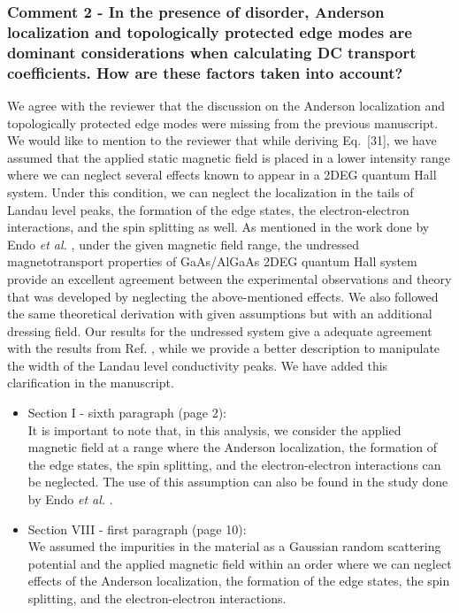 \documentclass{article}
\begin{document}
\subsubsection*{Comment 2 -
\color{RoyalBlue} In the presence of disorder, Anderson localization and topologically protected edge modes are dominant considerations when calculating DC transport coefficients. How are these factors taken into account?
}

We agree with the reviewer that the discussion on the Anderson localization and topologically protected edge modes were missing from the previous manuscript.
We would like to mention to the reviewer that while deriving Eq.~[31], we have assumed that the applied static magnetic field is placed in a lower intensity range where we can neglect several effects known to appear in a 2DEG quantum Hall system. Under this condition, we can neglect the localization in the tails of Landau level peaks, the formation of the edge states, the electron-electron interactions, and the spin splitting as well. As mentioned in the work done by Endo \textit{et al.} \cite{endo09}, under the given magnetic field range, the undressed magnetotransport properties of GaAs/AlGaAs 2DEG quantum Hall system provide an excellent agreement between the experimental observations and theory that was developed by neglecting the above-mentioned effects. We also followed the same theoretical derivation with given assumptions but with an additional dressing field. Our results for the undressed system give a adequate agreement with the results from Ref. \cite{endo09}, while we provide a better description to manipulate the width of the Landau level conductivity peaks. We have added this clarification in the manuscript.

\begin{itemize}
  \item Section I - sixth paragraph (page 2):\\
  {\color{Red}
  It is important to note that, in this analysis, we consider the applied magnetic field at a range where the Anderson localization, the formation of the edge states, the spin splitting, and the electron-electron interactions can be neglected. The use of this assumption can also be found in the study done by Endo \textit{et al.} \cite{endo09}.
  }
  \item Section VIII - first paragraph (page 10):\\
  {\color{Red}
  We assumed the impurities in the material as a Gaussian random scattering potential and the applied magnetic field within an order where we can neglect effects of the Anderson localization, the formation of the edge states, the spin splitting, and the electron-electron interactions.
  }
\end{itemize}
\end{document}

